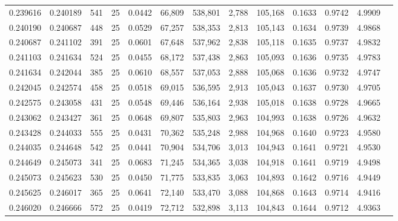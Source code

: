 \begin{tabular}{rrrrrrrrrrrrr}
0.239616 & 0.240189 &   541 &  25 &                                     0.0442 &  66,809 & 538,801 &   2,788 & 105,168 & 0.1633 & 0.9742 & 4.9909 \\
0.240190 & 0.240687 &   448 &  25 &                                     0.0529 &  67,257 & 538,353 &   2,813 & 105,143 & 0.1634 & 0.9739 & 4.9868 \\
0.240687 & 0.241102 &   391 &  25 &                                     0.0601 &  67,648 & 537,962 &   2,838 & 105,118 & 0.1635 & 0.9737 & 4.9832 \\
0.241103 & 0.241634 &   524 &  25 &                                     0.0455 &  68,172 & 537,438 &   2,863 & 105,093 & 0.1636 & 0.9735 & 4.9783 \\
0.241634 & 0.242044 &   385 &  25 &                                     0.0610 &  68,557 & 537,053 &   2,888 & 105,068 & 0.1636 & 0.9732 & 4.9747 \\
0.242045 & 0.242574 &   458 &  25 &                                     0.0518 &  69,015 & 536,595 &   2,913 & 105,043 & 0.1637 & 0.9730 & 4.9705 \\
0.242575 & 0.243058 &   431 &  25 &                                     0.0548 &  69,446 & 536,164 &   2,938 & 105,018 & 0.1638 & 0.9728 & 4.9665 \\
0.243062 & 0.243427 &   361 &  25 &                                     0.0648 &  69,807 & 535,803 &   2,963 & 104,993 & 0.1638 & 0.9726 & 4.9632 \\
0.243428 & 0.244033 &   555 &  25 &                                     0.0431 &  70,362 & 535,248 &   2,988 & 104,968 & 0.1640 & 0.9723 & 4.9580 \\
0.244035 & 0.244648 &   542 &  25 &                                     0.0441 &  70,904 & 534,706 &   3,013 & 104,943 & 0.1641 & 0.9721 & 4.9530 \\
0.244649 & 0.245073 &   341 &  25 &                                     0.0683 &  71,245 & 534,365 &   3,038 & 104,918 & 0.1641 & 0.9719 & 4.9498 \\
0.245073 & 0.245623 &   530 &  25 &                                     0.0450 &  71,775 & 533,835 &   3,063 & 104,893 & 0.1642 & 0.9716 & 4.9449 \\
0.245625 & 0.246017 &   365 &  25 &                                     0.0641 &  72,140 & 533,470 &   3,088 & 104,868 & 0.1643 & 0.9714 & 4.9416 \\
0.246020 & 0.246666 &   572 &  25 &                                     0.0419 &  72,712 & 532,898 &   3,113 & 104,843 & 0.1644 & 0.9712 & 4.9363 \\

\end{tabular}
